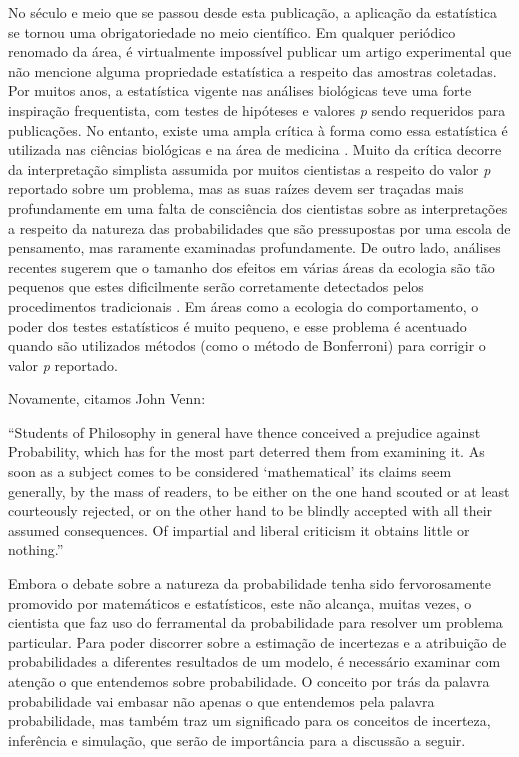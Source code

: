 \documentclass[12pt,a4paper]{article}
\begin{document}
No século e meio que se passou desde esta publicação, a aplicação da estatística se tornou uma obrigatoriedade no meio científico.
Em qualquer periódico renomado da área, é virtualmente impossível publicar um artigo experimental que não 
mencione alguma propriedade
estatística a respeito das amostras coletadas. Por muitos anos, a estatística vigente nas análises biológicas teve uma
forte inspiração frequentista, com testes de hipóteses e valores {\em p} sendo requeridos para publicações. 
No entanto, existe uma ampla crítica à forma como essa estatística é
utilizada nas ciências biológicas e na área de medicina \cite{Ioannidis05}.
Muito da crítica decorre da interpretação
simplista assumida por muitos cientistas a respeito do valor {\em p} reportado sobre um problema, mas as suas raízes devem
ser traçadas mais profundamente em uma falta de consciência dos cientistas sobre as interpretações a respeito da natureza
das probabilidades que são pressupostas por uma escola de pensamento, mas raramente examinadas profundamente. 
De outro lado, análises recentes sugerem que o tamanho dos efeitos em várias áreas da ecologia são tão pequenos que estes
dificilmente serão corretamente detectados pelos procedimentos tradicionais \cite{Jennions03}. Em áreas como a ecologia do
comportamento, o poder dos testes estatísticos é muito pequeno, e esse problema é acentuado quando são utilizados métodos
(como o método de Bonferroni) para corrigir o valor {\em p} reportado.

Novamente, citamos John Venn:

``Students of Philosophy in general have thence conceived a prejudice against Probability, which has for the most part
deterred them from examining it. As soon as a subject comes to be considered `mathematical' its claims seem generally,
by the mass of readers, to be either on the one hand scouted or at least courteously rejected, or on the other hand
to be blindly accepted with all their assumed consequences. Of impartial and liberal criticism it obtains little or nothing.''
\cite{Venn1866}

Embora o debate sobre a natureza da probabilidade tenha sido fervorosamente promovido por matemáticos e estatísticos,
este não alcança, muitas vezes, o cientista que faz uso do ferramental da probabilidade para resolver um problema particular.
Para poder discorrer sobre a estimação de incertezas e a atribuição de probabilidades a diferentes resultados de um modelo,
é necessário examinar com atenção o que entendemos sobre probabilidade. O conceito por trás da palavra probabilidade vai
embasar não apenas o que entendemos pela palavra probabilidade, mas também traz um significado para os conceitos de
incerteza, inferência e simulação, que serão de importância para a discussão a seguir.
\end{document}
